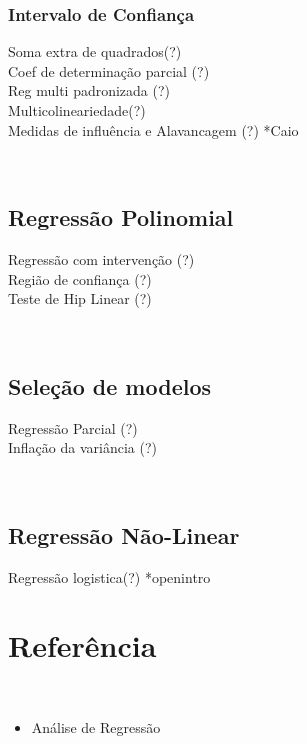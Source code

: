 \documentclass[
]{article}
\providecommand{\tightlist}{%
  \setlength{\itemsep}{0pt}\setlength{\parskip}{0pt}}
\begin{document}
\hypertarget{intervalo-de-confianuxe7a}{%
\subsubsection{Intervalo de Confiança}\label{intervalo-de-confianuxe7a}}

Soma extra de quadrados(?)\\
Coef de determinação parcial (?)\\
Reg multi padronizada (?)\\
Multicolineariedade(?)\\
Medidas de influência e Alavancagem (?) *Caio

~

\hypertarget{regressuxe3o-polinomial}{%
\subsection{Regressão Polinomial}\label{regressuxe3o-polinomial}}

Regressão com intervenção (?)\\
Região de confiança (?)\\
Teste de Hip Linear (?)

~

\hypertarget{seleuxe7uxe3o-de-modelos}{%
\subsection{Seleção de modelos}\label{seleuxe7uxe3o-de-modelos}}

Regressão Parcial (?)\\
Inflação da variância (?)

~

\hypertarget{regressuxe3o-nuxe3o-linear}{%
\subsection{Regressão Não-Linear}\label{regressuxe3o-nuxe3o-linear}}

Regressão logistica(?) *openintro

\hypertarget{referuxeancia}{%
\section{Referência}\label{referuxeancia}}

~

\begin{itemize}
\tightlist
\item
  Análise de Regressão
\end{itemize}
\end{document}
